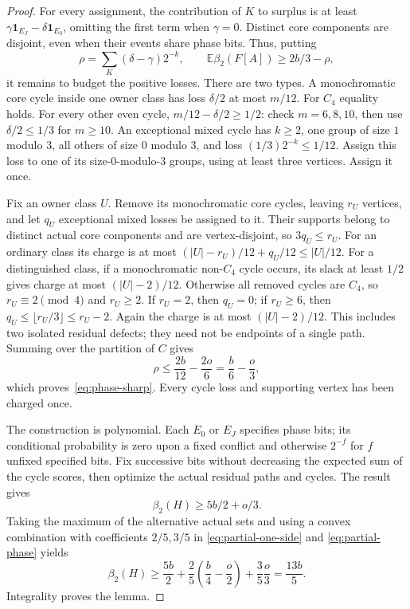 \documentclass[11pt]{article}
\newcommand{\diss}{\beta_2}
\begin{document}
\begin{proof}
For every assignment, the contribution of $K$ to surplus is at least
$\gamma\mathbf1_{E_J}-\delta\mathbf1_{E_0}$, omitting the first term
when $\gamma=0$. Distinct core components are disjoint, even when their
events share phase bits. Thus, putting
\[
 \rho=\sum_K(\delta-\gamma)2^{-k},
 \qquad \mathbb E\diss(F[A])\ge2b/3-\rho,
\]
it remains to budget the positive losses. There are two types.
A monochromatic core cycle inside one owner class has loss $\delta/2$
at most $m/12$. For $C_4$ equality holds. For every other even cycle,
$m/12-\delta/2\ge1/2$: check $m=6,8,10$, then use
$\delta/2\le1/3$ for $m\ge10$.
An exceptional mixed cycle has $k\ge2$, one group of size $1$ modulo
$3$, all others of size $0$ modulo $3$, and loss
$(1/3)2^{-k}\le1/12$. Assign this loss to one of its size-$0$-modulo-$3$
groups, using at least three vertices. Assign it once.

Fix an owner class $U$. Remove its monochromatic core cycles, leaving
$r_U$ vertices, and let $q_U$ exceptional mixed losses be assigned to it.
Their supports belong to distinct actual core components and are
vertex-disjoint, so $3q_U\le r_U$. For an ordinary class its charge is
at most $(|U|-r_U)/12+q_U/12\le|U|/12$.
For a distinguished class, if a monochromatic non-$C_4$ cycle occurs,
its slack at least $1/2$ gives charge at most $(|U|-2)/12$.
Otherwise all removed cycles are $C_4$, so $r_U\equiv2\pmod4$ and
$r_U\ge2$. If $r_U=2$, then $q_U=0$; if $r_U\ge6$, then
$q_U\le\lfloor r_U/3\rfloor\le r_U-2$. Again the charge is at most
$(|U|-2)/12$. This includes two isolated residual defects; they need
not be endpoints of a single path.
Summing over the partition of $C$ gives
\[
 \rho\le\frac{2b}{12}-\frac{2o}{6}=\frac b6-\frac o3,
\]
which proves~\eqref{eq:phase-sharp}. Every cycle loss and supporting
vertex has been charged once.

The construction is polynomial. Each $E_0$ or $E_J$ specifies phase
bits; its conditional probability is zero upon a fixed conflict and
otherwise $2^{-f}$ for $f$ unfixed specified bits. Fix successive bits
without decreasing the expected sum of the cycle scores, then optimize
the actual residual paths and cycles. The result gives
\begin{equation}\label{eq:partial-phase}
 \diss(H)\ge5b/2+o/3.
\end{equation}
Taking the maximum of the alternative actual sets and using a convex
combination with coefficients $2/5,3/5$ in
\eqref{eq:partial-one-side} and \eqref{eq:partial-phase} yields
\[
 \diss(H)\ge\frac{5b}{2}
       +\frac25\left(\frac b4-\frac o2\right)
       +\frac35\frac o3=\frac{13b}{5}.
\]
Integrality proves the lemma.
\end{proof}
\end{document}

